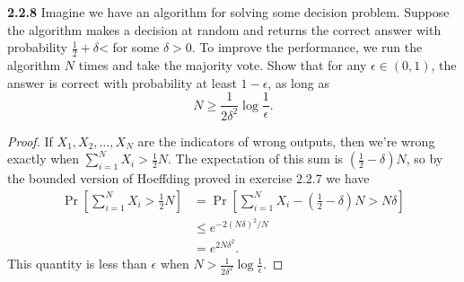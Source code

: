 \documentclass[11pt,letterpaper]{report}
\begin{document}
\noindent\textbf{2.2.8}
Imagine we have an algorithm for solving some decision problem. Suppose the algorithm makes a decision at random and returns the correct answer with probability $\frac{1}{2}+\delta$< for some $\delta>0$. To improve the performance, we run the algorithm $N$ times and take the majority vote. Show that for any $\epsilon \in (0, 1)$, the answer is correct with probability at least $1-\epsilon$, as long as
\[
N\geq \frac{1}{2\delta^2}\log\frac{1}{\epsilon}.
\]
\begin{proof}
	If $X_1, X_2, \ldots, X_N$ are the indicators of wrong outputs, then we're wrong exactly when $\sum_{i=1}^NX_i > \frac{1}{2}N$. The expectation of this sum is  $(\frac{1}{2}-\delta)N$, so by the bounded version of Hoeffding proved in exercise 2.2.7 we have
	\begin{align*}
		\Pr\left[\sum_{i=1}^NX_i > \frac{1}{2}N\right] &= \Pr\left[\sum_{i=1}^NX_i - \left(\frac{1}{2}-\delta\right)N> N\delta \right]\\
		&\leq e^{-2(N\delta)^2/N}\\
		&= e^{2N\delta^2}.
	\end{align*}
	This quantity is less than $\epsilon$ when $N>\frac{1}{2\delta^2}\log\frac{1}{\epsilon}$.
\end{proof}
\end{document}
